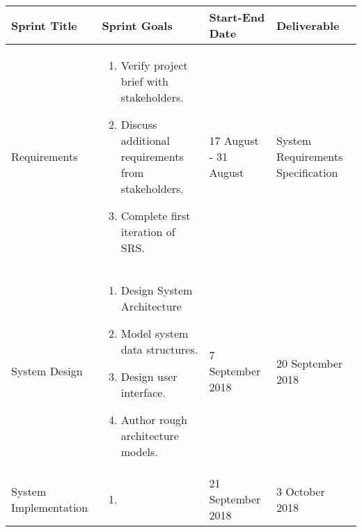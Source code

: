 \documentclass[11pt]{article}
\begin{document}
\begin{table}[H]
	\hskip-4.0cm\begin{tabular}[\textwidth]{@{}|l|l|l|l|@{}}
		\toprule
		Sprint Title & Sprint Goals & Start-End Date & Deliverable \\ \midrule
		Requirements & \begin{minipage}{0.3\textwidth}
		\begin{enumerate}[leftmargin= 0.1\textwidth]
			\item Verify project brief with stakeholders.
			\item Discuss additional requirements from stakeholders.
			\item Complete first iteration of SRS.
		\end{enumerate}
		\end{minipage}& 17 August - 31 August & System Requirements Specification \\ \midrule
	System Design	&  \begin{minipage}{0.3\textwidth}
		\begin{enumerate}[leftmargin= 0.1\textwidth]
			\item Design System Architecture
			\item Model system data structures.
			\item Design user interface.
			\item Author rough architecture models.
		\end{enumerate}
	\end{minipage} & 7 September 2018 & 20 September 2018 \\ \midrule
	System Implementation  &\begin{minipage}{0.3\textwidth}
		\begin{enumerate}[leftmargin= 0.1\textwidth]
			\item  
		\end{enumerate}
	\end{minipage}  & 21 September 2018 & 3 October 2018 \\ \bottomrule
	\end{tabular}
\end{table}
\end{document}
